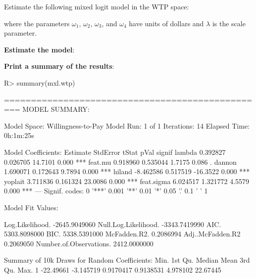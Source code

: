 \documentclass[article]{jss}
\begin{document}
Estimate the following mixed logit model in the WTP space:



where the parameters \(\omega_1\), \(\omega_2\), \(\omega_3\), and
\(\omega_4\) have units of dollars and \(\lambda\) is the scale
parameter.

\textbf{Estimate the model}:

\begin{CodeChunk}

\end{CodeChunk}

\textbf{Print a summary of the results}:

\begin{CodeChunk}

\begin{CodeInput}
R> summary(mxl.wtp)
\end{CodeInput}

\begin{CodeOutput}
=================================================
MODEL SUMMARY: 
                                
Model Space:  Willingness-to-Pay
Model Run:                1 of 1
Iterations:                   14
Elapsed Time:          0h:1m:25s

Model Coefficients: 
            Estimate StdError    tStat  pVal signif
lambda      0.392827 0.026705  14.7101 0.000    ***
feat.mu     0.918960 0.535044   1.7175 0.086      .
dannon      1.690071 0.172643   9.7894 0.000    ***
hiland     -8.462586 0.517519 -16.3522 0.000    ***
yoplait     3.711836 0.161324  23.0086 0.000    ***
feat.sigma  6.024517 1.321772   4.5579 0.000    ***
---
Signif. codes:  0 '***' 0.001 '**' 0.01 '*' 0.05 '.' 0.1 ' ' 1

Model Fit Values: 
                                     
Log.Likelihood.         -2645.9049060
Null.Log.Likelihood.    -3343.7419990
AIC.                     5303.8098000
BIC.                     5338.5391000
McFadden.R2.                0.2086994
Adj..McFadden.R2            0.2069050
Number.of.Observations.  2412.0000000

Summary of 10k Draws for Random Coefficients: 
       Min.   1st Qu.    Median      Mean  3rd Qu.     Max.
1 -22.49661 -3.145719 0.9170417 0.9138531 4.978102 22.67445
\end{CodeOutput}
\end{CodeChunk}
\end{document}
